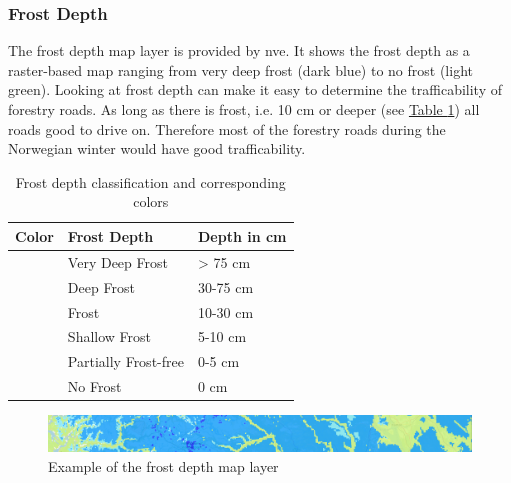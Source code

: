 \subsubsection*{Frost Depth}
The frost depth map layer is provided by \acrshort{nve}. It shows the frost depth as a raster-based map ranging from very deep frost (dark blue) to no frost (light green). Looking at frost depth can make it easy to determine the trafficability of forestry roads. As long as there is frost, i.e. 10 cm or deeper (see \hyperref[tab:frost_depth_classification]{Table \ref*{tab:frost_depth_classification}}) all roads good to drive on. Therefore most of the forestry roads during the Norwegian winter would have good trafficability.

\begin{table}[h]
    \centering
    \begin{tabular}{|l|l|l|}
        \hline  
        Color & Frost Depth & Depth in cm \\
        \hline
        \cellcolor[HTML]{00009c} & Very Deep Frost & > 75 cm \\
        \hline
        \cellcolor[HTML]{0018ff} & Deep Frost & 30-75 cm \\
        \hline
        \cellcolor[HTML]{009aff} & Frost & 10-30 cm \\
        \hline
        \cellcolor[HTML]{84ebff} & Shallow Frost & 5-10 cm \\
        \hline
        \cellcolor[HTML]{deffff} & Partially Frost-free & 0-5 cm \\
        \hline
        \cellcolor[HTML]{cef77b} & No Frost & 0 cm \\
        \hline
    \end{tabular}
    \caption{Frost depth classification and corresponding colors \cite{nve2025waterdata}}
    \label{tab:frost_depth_classification}
\end{table}

\begin{figure}[h]
    \centering
    \includegraphics[width=1\linewidth]{figures/teledyp_eksempel.pdf}
    \caption{Example of the frost depth map layer}
    \label{fig:frost_depth_example}
\end{figure}

